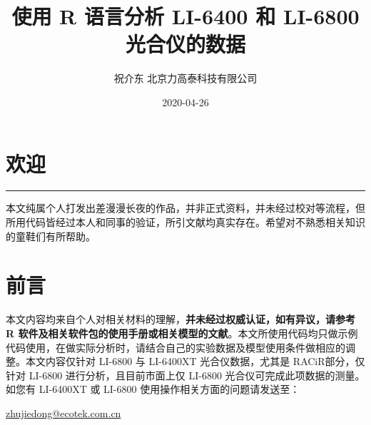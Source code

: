 \documentclass[
]{krantz}
\title{使用 R 语言分析 LI-6400 和 LI-6800 光合仪的数据}
\author{祝介东 北京力高泰科技有限公司}
\date{2020-04-26}
\begin{document}
\maketitle





\thispagestyle{empty}

\setlength{\abovedisplayskip}{-5pt}
\setlength{\abovedisplayshortskip}{-5pt}

{
\hypersetup{linkcolor=}
\setcounter{tocdepth}{2}
\tableofcontents
}
\listoftables
\listoffigures
\hypertarget{welcome}{%
\chapter*{欢迎}\label{welcome}}


\begin{center}\rule{0.5\linewidth}{0.5pt}\end{center}

本文纯属个人打发出差漫漫长夜的作品，并非正式资料，并未经过校对等流程，但所用代码皆经过本人和同事的验证，所引文献均真实存在。希望对不熟悉相关知识的童鞋们有所帮助。

\frontmatter

\hypertarget{frontmatter}{%
\chapter*{前言}\label{frontmatter}}


本文内容均来自个人对相关材料的理解，\textbf{并未经过权威认证，如有异议，请参考 R 软件及相关软件包的使用手册或相关模型的文献}。本文所使用代码均只做示例代码使用，在做实际分析时，请结合自己的实验数据及模型使用条件做相应的调整。本文内容仅针对
LI-6800 与 LI-6400XT 光合仪数据，尤其是 RACiR\texttrademark 部分，仅针对 LI-6800
进行分析，且目前市面上仅 LI-6800 光合仪可完成此项数据的测量。如您有 LI-6400XT 或 LI-6800 使用操作相关方面的问题请发送至：

\url{zhujiedong@ecotek.com.cn}
\end{document}
